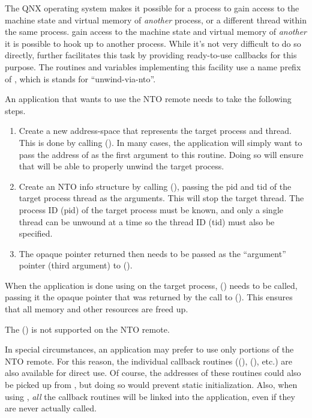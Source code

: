 \documentclass{article}
\begin{document}
The QNX operating system makes it possible for a process to
gain access to the machine state and virtual memory of \emph{another}
process, or a different thread within the same process.
gain access to the machine state and virtual memory of \emph{another}
it is possible to hook up  to another process.
While it's not very difficult to do so directly,
 further facilitates this task by providing
ready-to-use callbacks for this purpose.
The routines and variables
implementing this facility use a name prefix of ,
which is stands for ``unwind-via-nto''.

An application that wants to use the  NTO remote needs
to take the following steps.
\begin{enumerate}

    \item Create a new  address-space that represents the target
        process and thread.  This is done by calling
        ().  In many cases, the application will
        simply want to pass the address of  as the
        first argument to this routine.  Doing so will ensure that
         will be able to properly unwind the target process.

    \item Create an NTO info structure by calling (),
        passing the pid and tid of the target process thread as the arguments.
        This will stop the target thread.  The process ID (pid) of the target
        process must be known, and only a single thread can be unwound at a time
        so the thread ID (tid) must also be specified.

    \item The opaque pointer returned then needs to be passed as the
        ``argument'' pointer (third argument) to ().

\end{enumerate}

When the application is done using  on the target process,
() needs to be called, passing it the opaque pointer
that was returned by the call to ().  This ensures that
all memory and other resources are freed up.

The () is not supported on the NTO remote.

In special circumstances, an application may prefer to use
only portions of the  NTO remote.  For this reason, the
individual callback routines ((),
(), etc.)  are also available for direct
use.  Of course, the addresses of these routines could also be picked
up from , but doing so would prevent static
initialization.  Also, when using , \emph{all}
the callback routines will be linked into the application, even if
they are never actually called.
\end{document}
